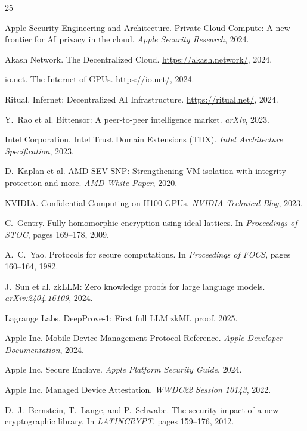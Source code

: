 \documentclass[10pt,twocolumn,letterpaper]{article}
\begin{document}

\begin{thebibliography}{25}

Apple Security Engineering and Architecture.
Private Cloud Compute: A new frontier for AI privacy in the cloud.
\emph{Apple Security Research}, 2024.

Akash Network. The Decentralized Cloud. \url{https://akash.network/}, 2024.

io.net. The Internet of GPUs. \url{https://io.net/}, 2024.

Ritual. Infernet: Decentralized AI Infrastructure. \url{https://ritual.net/}, 2024.

Y.~Rao et al. Bittensor: A peer-to-peer intelligence market. \emph{arXiv}, 2023.

Intel Corporation. Intel Trust Domain Extensions (TDX). \emph{Intel Architecture Specification}, 2023.

D.~Kaplan et al. AMD SEV-SNP: Strengthening VM isolation with integrity protection and more. \emph{AMD White Paper}, 2020.

NVIDIA. Confidential Computing on H100 GPUs. \emph{NVIDIA Technical Blog}, 2023.

C.~Gentry. Fully homomorphic encryption using ideal lattices. In \emph{Proceedings of STOC}, pages 169--178, 2009.

A.~C.~Yao. Protocols for secure computations. In \emph{Proceedings of FOCS}, pages 160--164, 1982.

J.~Sun et al. zkLLM: Zero knowledge proofs for large language models. \emph{arXiv:2404.16109}, 2024.

Lagrange Labs. DeepProve-1: First full LLM zkML proof. 2025.

Apple Inc. Mobile Device Management Protocol Reference. \emph{Apple Developer Documentation}, 2024.

Apple Inc. Secure Enclave. \emph{Apple Platform Security Guide}, 2024.

Apple Inc. Managed Device Attestation. \emph{WWDC22 Session 10143}, 2022.

D.~J.~Bernstein, T.~Lange, and P.~Schwabe. The security impact of a new cryptographic library. In \emph{LATINCRYPT}, pages 159--176, 2012.


\end{thebibliography}
\end{document}
